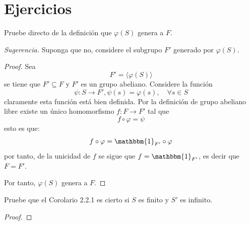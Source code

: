 \documentclass[12pt]{report}
\theoremstyle{largebreak}
\newcommand\cf[3]{\ensuremath{#1:#2\rightarrow#3}}
\newcommand{\bbm}[1]{\mathbbm{#1}}
\begin{document}
    \section{Ejercicios}

    \begin{excer}
        Pruebe directo de la definición que $\varphi(S)$ genera a $F$.

        \textit{Sugerencia.} Suponga que no, considere el subgrupo $F'$ generado por $\varphi(S)$.
    \end{excer}

    \begin{proof}
        Sea
        \begin{equation*}
            F'=\langle\varphi(S)\rangle
        \end{equation*}
        se tiene que $F'\subseteq F$ y $F'$ es un grupo abeliano. Considere la función
        \begin{equation*}
            \cf{\psi}{S}{F'},\psi(s)=\varphi(s),\quad\forall s\in S
        \end{equation*}
        claramente esta función está bien definida. Por la definición de grupo abeliano libre existe un único homomorfismo $\cf{f}{F}{F'}$ tal que
        \begin{equation*}
            f\circ\varphi=\psi
        \end{equation*}
        esto es que:
        \begin{equation*}
            f\circ\varphi=\bbm{1}_{F'}\circ\varphi
        \end{equation*}
        por tanto, de la unicidad de $f$ se sigue que $f=\bbm{1}_{F'}$, es decir que $F=F'$.

        Por tanto, $\varphi(S)$ genera a $F$.
    \end{proof}

    \begin{excer}
        Pruebe que el Corolario 2.2.1 es cierto si $S$ es finito y $S'$ es infinito.
    \end{excer}
    
    \begin{proof}
        
    \end{proof}

    
    \begin{excer}[Nombre]
        
    \end{excer}
\end{document}
